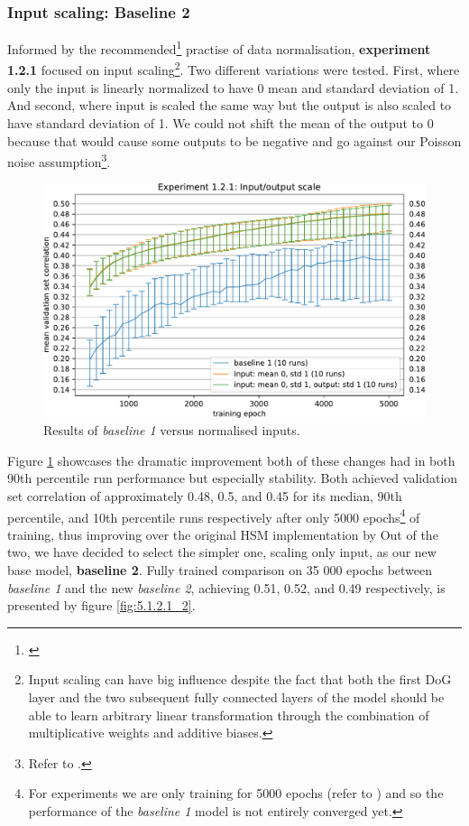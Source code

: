 \subsubsection{Input scaling: Baseline 2}\label{ex:1.2.1}
Informed by the recommended\footnote{\citep{10.5555/645754.668382}} practise of data normalisation, \textbf{experiment 1.2.1} focused on input scaling\footnote{Input scaling can have big influence despite the fact that both the first DoG layer and the two subsequent fully connected layers of the model should be able to learn arbitrary linear transformation through the combination of multiplicative weights and additive biases.}. Two different variations were tested. First, where only the input is linearly normalized to have 0 mean and standard deviation of 1. And second, where input is scaled the same way but the output is also scaled to have standard deviation of 1. We could not shift the mean of the output to 0 because that would cause some outputs to be negative and go against our Poisson noise assumption\footnote{Refer to .}.

\begin{figure}[H]
    \centering
    \includegraphics[width=1\textwidth]{../figures/05_1_2_1}
    \caption[Experiment 1.2.1]{Results of \textit{baseline 1} versus normalised inputs\protect\footnotemark.}
    \label{fig:5.1.2.1}
\end{figure}

Figure \ref{fig:5.1.2.1} showcases the dramatic improvement both of these changes had in both 90th percentile run performance but especially stability. Both achieved validation set correlation of approximately 0.48, 0.5, and 0.45 for its median, 90th percentile, and 10th percentile runs respectively after only 5000 epochs\footnote{For experiments we are only training for 5000 epochs (refer to  ) and so the performance of the \emph{baseline 1} model is not entirely converged yet.} of training, thus improving over the original HSM implementation by \citeauthor{antolik} Out of the two, we have decided to select the simpler one, scaling only input, as our new base model, \textbf{baseline 2}. Fully trained comparison on 35 000 epochs between \emph{baseline 1} and the new \emph{baseline 2}, achieving 0.51, 0.52, and 0.49 respectively, is presented by figure \ref{fig:5.1.2.1_2}.

